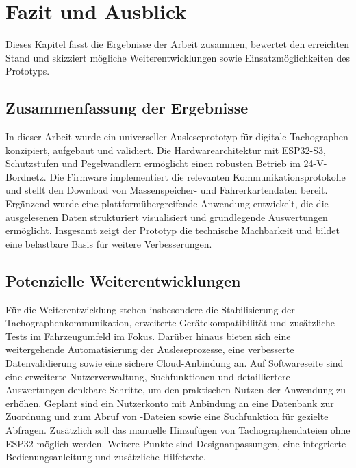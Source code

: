\chapter{Fazit und Ausblick}
Dieses Kapitel fasst die Ergebnisse der Arbeit zusammen, bewertet den erreichten Stand und skizziert mögliche Weiterentwicklungen sowie Einsatzmöglichkeiten des Prototyps.

\section{Zusammenfassung der Ergebnisse}
In dieser Arbeit wurde ein universeller Ausleseprototyp für digitale Tachographen konzipiert, aufgebaut und validiert. Die Hardwarearchitektur mit ESP32-S3, Schutzstufen und Pegelwandlern ermöglicht einen robusten Betrieb im 24-V-Bordnetz. Die Firmware implementiert die relevanten Kommunikationsprotokolle und stellt den Download von Massenspeicher- und Fahrerkartendaten bereit. Ergänzend wurde eine plattformübergreifende Anwendung entwickelt, die die ausgelesenen Daten strukturiert visualisiert und grundlegende Auswertungen ermöglicht. Insgesamt zeigt der Prototyp die technische Machbarkeit und bildet eine belastbare Basis für weitere Verbesserungen.

\section{Potenzielle Weiterentwicklungen}
Für die Weiterentwicklung stehen insbesondere die Stabilisierung der Tachographenkommunikation, erweiterte Gerätekompatibilität und zusätzliche Tests im Fahrzeugumfeld im Fokus. Darüber hinaus bieten sich eine weitergehende Automatisierung der Ausleseprozesse, eine verbesserte Datenvalidierung sowie eine sichere Cloud-Anbindung an. Auf Softwareseite sind eine erweiterte Nutzerverwaltung, Suchfunktionen und detailliertere Auswertungen denkbare Schritte, um den praktischen Nutzen der Anwendung zu erhöhen.
Geplant sind ein Nutzerkonto mit Anbindung an eine Datenbank zur Zuordnung und zum Abruf von -Dateien sowie eine Suchfunktion für gezielte Abfragen. Zusätzlich soll das manuelle Hinzufügen von Tachographendateien ohne ESP32 möglich werden. Weitere Punkte sind Designanpassungen, eine integrierte Bedienungsanleitung und zusätzliche Hilfetexte.

